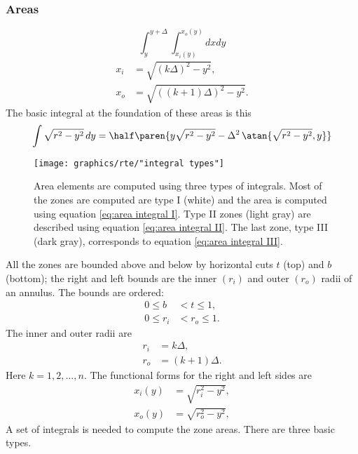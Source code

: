 \subsubsection{Areas}
%
\begin{equation}
  \int_{y}^{y+\Delta} \int_{x_{i}(y)}^{x_{o}(y)} dx dy
\end{equation}
%
\begin{equation}
  \begin{split}
    x_{i} &= \sqrt{ (k\Delta)^{2} - y^{2}}, \\
    x_{o} &= \sqrt{ ((k+1)\Delta)^{2} - y^{2}}.
  \end{split}
\end{equation}
%
The basic integral at the foundation of these areas is this
%
\begin{equation}
  \int \sqrt{ r^{2} - y^{2} }\, dy = \half \paren{ y \sqrt{ r^{2} - y^{2} } - \Delta^{2}\, \atan{\sqrt{ r^{2} - y^{2} }, y}}
\end{equation}
%
\begin{figure}[htbp] 
   \centering
   \texttt{[image: graphics/rte/"integral types"]} 
   \caption[Area elements are computed using three types of integrals]{Area elements are computed using three types of integrals. Most of the zones are computed are type I (white) and the area is computed using equation \eqref{eq:area integral I}. Type II zones (light gray) are described using equation \eqref{eq:area integral II}. The last zone, type III (dark gray), corresponds to equation \eqref{eq:area integral III}.}
   \label{fig:integral types}
\end{figure}

All the zones are bounded above and below by horizontal cuts $t$ (top) and $b$ (bottom); the right and left bounds are the inner $(r_{i})$ and outer $(r_{o})$ radii of an annulus. The bounds are ordered:
%
\begin{equation}
  \begin{split}
    0 \le b &< t \le 1, \\
    0 \le r_{i} &< r_{o} \le 1.
  \end{split}
\end{equation}
%
The inner and outer radii are
\begin{equation}
  \begin{split}
    r_{i} &= k \Delta, \\
    r_{o} &= ( k + 1 ) \Delta.
  \end{split}
\end{equation}
%
Here $k=1,2,\dots,n$.
%
The functional forms for the right and left sides are
\begin{equation}
  \begin{split}
    x_{i}(y) &= \sqrt{ r_{i}^{2} - y^{2} }, \\
    x_{o}(y) &= \sqrt{ r_{o}^{2} - y^{2} },
  \end{split}
\end{equation}
A set of integrals is needed to compute the zone areas. There are three basic types.

